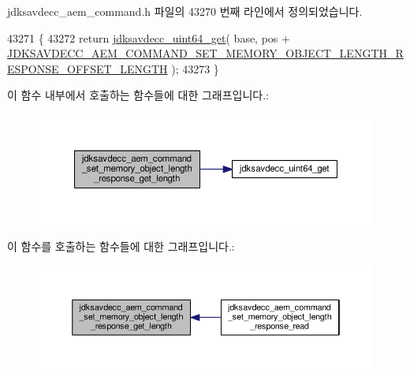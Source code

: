 jdksavdecc\+\_\+aem\+\_\+command.\+h 파일의 43270 번째 라인에서 정의되었습니다.


\begin{DoxyCode}
43271 \{
43272     \textcolor{keywordflow}{return} \hyperlink{group__endian_gac8c2b48b7d7db101708e0197e366ac42}{jdksavdecc\_uint64\_get}( base, pos + 
      \hyperlink{group__command__set__memory__object__length__response_ga0b1a77e125f9bb1d16b576adb8bc8021}{JDKSAVDECC\_AEM\_COMMAND\_SET\_MEMORY\_OBJECT\_LENGTH\_RESPONSE\_OFFSET\_LENGTH}
       );
43273 \}
\end{DoxyCode}


이 함수 내부에서 호출하는 함수들에 대한 그래프입니다.\+:
\nopagebreak
\begin{figure}[H]
\begin{center}
\leavevmode
\includegraphics[width=350pt]{group__command__set__memory__object__length__response_ga5cd962cb047db9a38b577037eb5a5f9a_cgraph}
\end{center}
\end{figure}




이 함수를 호출하는 함수들에 대한 그래프입니다.\+:
\nopagebreak
\begin{figure}[H]
\begin{center}
\leavevmode
\includegraphics[width=350pt]{group__command__set__memory__object__length__response_ga5cd962cb047db9a38b577037eb5a5f9a_icgraph}
\end{center}
\end{figure}


